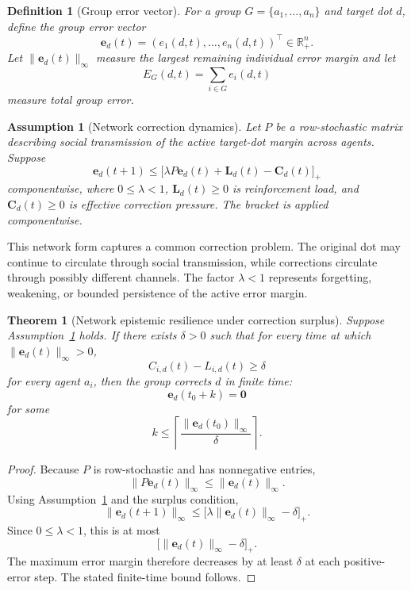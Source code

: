 \documentclass[11pt]{article}
\newtheorem{definition}{Definition}
\newtheorem{assumption}{Assumption}
\newtheorem{theorem}{Theorem}
\theoremstyle{remark}
\begin{document}
\begin{definition}[Group error vector]\label{def:group-error-vector}
For a group $G=\{a_1,\ldots,a_n\}$ and target dot $d$, define the group
error vector
$$
\mathbf e_d(t)=(e_1(d,t),\ldots,e_n(d,t))^\top\in\mathbb R_+^n.
$$
Let $\|\mathbf e_d(t)\|_\infty$ measure the largest remaining individual
error margin and let
$$
E_G(d,t)=\sum_{i\in G}e_i(d,t)
$$
measure total group error.
\end{definition}

\begin{assumption}[Network correction dynamics]\label{ass:network-correction-dynamics}
Let $P$ be a row-stochastic matrix describing social transmission of the
active target-dot margin across agents. Suppose
$$
\mathbf e_d(t+1)\leq
\big[\lambda P\mathbf e_d(t)+\mathbf L_d(t)-\mathbf C_d(t)\big]_+
$$
componentwise, where $0\leq\lambda<1$, $\mathbf L_d(t)\geq0$ is
reinforcement load, and $\mathbf C_d(t)\geq0$ is effective correction
pressure. The bracket is applied componentwise.
\end{assumption}

This network form captures a common correction problem. The original dot
may continue to circulate through social transmission, while corrections
circulate through possibly different channels. The factor $\lambda<1$
represents forgetting, weakening, or bounded persistence of the active
error margin.

\begin{theorem}[Network epistemic resilience under correction surplus]\label{thm:network-epistemic-resilience}
Suppose Assumption~\ref{ass:network-correction-dynamics} holds. If there
exists $\delta>0$ such that for every time at which
$\|\mathbf e_d(t)\|_\infty>0$,
$$
C_{i,d}(t)-L_{i,d}(t)\geq\delta
$$
for every agent $a_i$, then the group corrects $d$ in finite time:
$$
\mathbf e_d(t_0+k)=\mathbf 0
$$
for some
$$
k\leq \left\lceil\frac{\|\mathbf e_d(t_0)\|_\infty}{\delta}\right\rceil.
$$
\end{theorem}

\begin{proof}
Because $P$ is row-stochastic and has nonnegative entries,
$$
\|P\mathbf e_d(t)\|_\infty\leq\|\mathbf e_d(t)\|_\infty.
$$
Using Assumption~\ref{ass:network-correction-dynamics} and the surplus
condition,
$$
\|\mathbf e_d(t+1)\|_\infty
\leq
\big[\lambda\|\mathbf e_d(t)\|_\infty-\delta\big]_+.
$$
Since $0\leq\lambda<1$, this is at most
$$
\big[\|\mathbf e_d(t)\|_\infty-\delta\big]_+.
$$
The maximum error margin therefore decreases by at least $\delta$ at
each positive-error step. The stated finite-time bound follows.
\end{proof}
\end{document}
